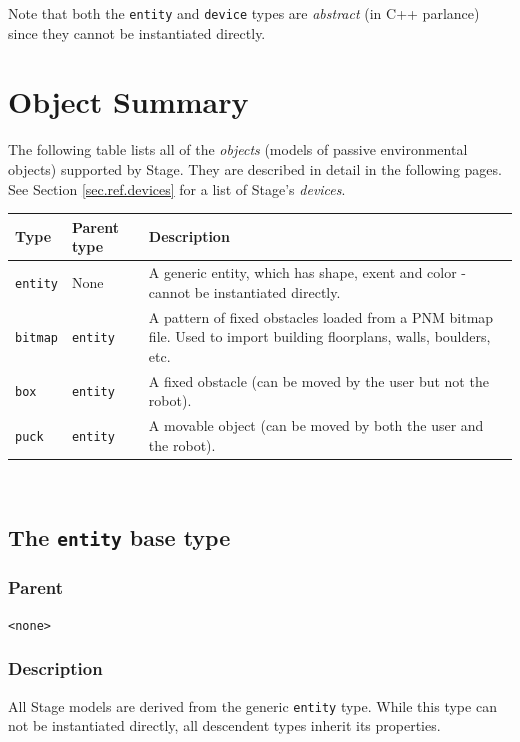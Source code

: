 \documentclass[11pt,twoside]{report}
\begin{document}
Note that both the \verb'entity' and \verb'device' types are {\em
abstract} (in C++ parlance) since they cannot be instantiated
directly.

\section{Object Summary}
\label{sec.ref.objects}

The following table lists all of the {\em objects} (models of passive
environmental objects) supported by Stage. They are described in
detail in the following pages. See Section \ref{sec.ref.devices} for a
list of Stage's {\em devices}.
\vspace{1em}\\\noindent
\begin{tabularx}{\columnwidth}{llX}
\hline 
Type & Parent type & Description \\
\hline 


\verb'entity' & None & A generic entity, which has shape, exent and
color - cannot be instantiated directly. \\

\hline

\verb'bitmap' & \verb'entity' & A pattern of fixed obstacles loaded
from a PNM bitmap file. Used to import building floorplans, walls,
boulders, etc. \\

\verb'box' & \verb'entity' & A fixed obstacle (can be moved by the
user but not the robot). \\

\verb'puck' & \verb'entity' & A movable object (can be moved by both
the user and the robot).\\

\hline
\end{tabularx}
\vspace{1em}\\



\newpage
\subsection{The {\tt entity} base type}

\subsubsection*{Parent}
{\tt <none>}

\subsubsection*{Description}
All Stage models are derived from the generic \verb'entity' type.
While this type can not be instantiated directly, all descendent types
inherit its properties.
\end{document}
